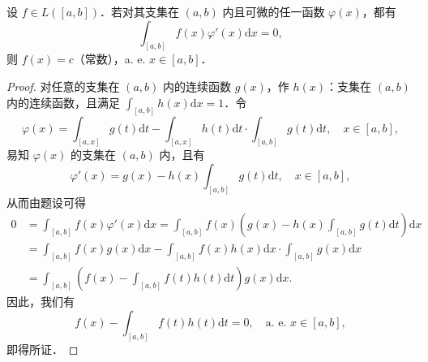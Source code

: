 \documentclass[../../main.tex]{subfiles}%
\begin{document}
\begin{example}
设 \( f \in L([a,b]) \)．若对其支集在 \( (a,b) \) 内且可微的任一函数 \( \varphi(x) \)，都有
\[
\int_{[a,b]} f(x)\varphi'(x) \mathrm{d}x = 0,
\]
则 \( f(x) = c \)（常数），a. e. \( x \in [a,b] \)．
\end{example}
\begin{proof}
对任意的支集在 \( (a,b) \) 内的连续函数 \( g(x) \)，作 \( h(x) \)：支集在 \( (a,b) \) 内的连续函数，且满足 \( \int_{[a,b]} h(x) \mathrm{d}x = 1 \)．令
\[
\varphi(x) = \int_{[a,x]} g(t) \mathrm{d}t - \int_{[a,x]} h(t) \mathrm{d}t \cdot \int_{[a,b]} g(t) \mathrm{d}t, \quad x \in [a,b],
\]
易知 \( \varphi(x) \) 的支集在 \( (a,b) \) 内，且有
\[
\varphi'(x) = g(x) - h(x)\int_{[a,b]} g(t) \mathrm{d}t, \quad x \in [a,b],
\]
从而由题设可得
\begin{align*}
0 &= \int_{[a,b]} f(x)\varphi'(x) \mathrm{d}x = \int_{[a,b]} f(x)\left( g(x) - h(x)\int_{[a,b]} g(t) \mathrm{d}t \right) \mathrm{d}x \\
&= \int_{[a,b]} f(x)g(x) \mathrm{d}x - \int_{[a,b]} f(x)h(x) \mathrm{d}x \cdot \int_{[a,b]} g(x) \mathrm{d}x \\
&= \int_{[a,b]} \left( f(x) - \int_{[a,b]} f(t)h(t) \mathrm{d}t \right) g(x) \mathrm{d}x.
\end{align*}
因此，我们有
\[
f(x) - \int_{[a,b]} f(t)h(t) \mathrm{d}t = 0, \quad \text{a. e. } x \in [a,b],
\]
即得所证．
\end{proof}
\end{document}
